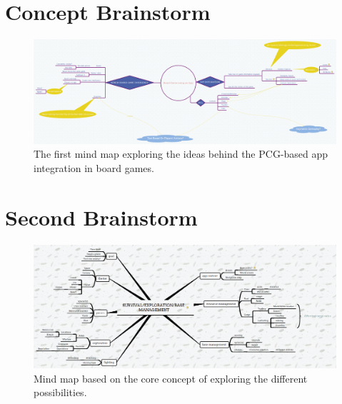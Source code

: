 \documentclass[a4paper,11pt]{report}
\begin{document}
\chapter{Concept Brainstorm}
\begin{figure}[h]
    \centering
    \includegraphics[scale=0.18,angle=-90]{Images/Brainstorm1.png}
    \caption{The first mind map exploring the ideas behind the PCG-based app integration in board games.}
    \label{fig:brainstorm1}
\end{figure}
\chapter{Second Brainstorm}
\begin{figure}[h]
    \centering
    \includegraphics[scale=0.25,angle=-90]{Images/Brainstorm2.png}
    \caption{Mind map based on the core concept of exploring the different possibilities.}
    \label{fig:brainstorm2}
\end{figure}
\end{document}

